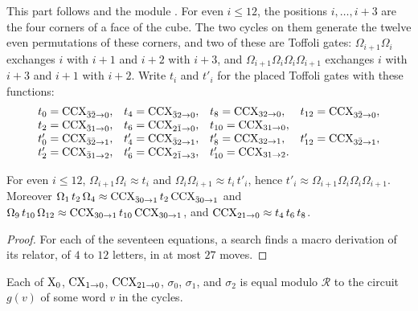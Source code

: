 \documentclass[acmsmall,screen,nonacm]{acmart}
\begin{document}
This part follows  and the module . For even $i\le12$, the positions $i,\dots,i+3$ are the four corners of a face of the cube. The two cycles on them generate the twelve even permutations of these corners, and two of these are Toffoli gates: $\Omega_{i+1}\Omega_i$ exchanges $i$ with $i+1$ and $i+2$ with $i+3$, and $\Omega_{i+1}\Omega_i\Omega_i\Omega_{i+1}$ exchanges $i$ with $i+3$ and $i+1$ with $i+2$. Write $t_i$ and $t'_i$ for the placed Toffoli gates with these functions:
\[
\begin{array}{@{}l@{\quad}l@{\quad}l@{\quad}l@{}}
t_0=\CCX_{\bar3\bar2\to0}, & t_4=\CCX_{\bar32\to0}, & t_8=\CCX_{32\to0}, & t_{12}=\CCX_{3\bar2\to0},\\
t_2=\CCX_{\bar31\to0}, & t_6=\CCX_{2\bar1\to0}, & t_{10}=\CCX_{31\to0}, &\\
t'_0=\CCX_{\bar3\bar2\to1}, & t'_4=\CCX_{\bar32\to1}, & t'_8=\CCX_{32\to1}, & t'_{12}=\CCX_{3\bar2\to1},\\
t'_2=\CCX_{\bar31\to2}, & t'_6=\CCX_{2\bar1\to3}, & t'_{10}=\CCX_{31\to2}. &
\end{array}
\]

\begin{lemma}\label{lem:x-squares}
For even $i\le12$, $\Omega_{i+1}\Omega_i\approx t_i$ and $\Omega_i\Omega_{i+1}\approx t_i\,t'_i$, hence $t'_i\approx\Omega_{i+1}\Omega_i\Omega_i\Omega_{i+1}$. Moreover $\Omega_1\,t_2\,\Omega_4\approx\mathrm{CCX}_{\bar30\to1}\,t_2\,\mathrm{CCX}_{\bar30\to1}$ and $\Omega_9\,t_{10}\,\Omega_{12}\approx\mathrm{CCX}_{30\to1}\,t_{10}\,\mathrm{CCX}_{30\to1}$, and $\mathrm{CCX}_{21\to0}\approx t_4\,t_6\,t_8$.
\end{lemma}

\begin{proof}
For each of the seventeen equations, a search finds a macro derivation of its relator, of $4$ to $12$ letters, in at most $27$ moves.
\end{proof}

\begin{lemma}\label{lem:x-some-word}
Each of $\mathrm{X}_0$, $\mathrm{CX}_{1\to0}$, $\mathrm{CCX}_{21\to0}$, $\sigma_0$, $\sigma_1$, and $\sigma_2$ is equal modulo $\mathcal{R}$ to the circuit $g(v)$ of some word $v$ in the cycles.
\end{lemma}
\end{document}

